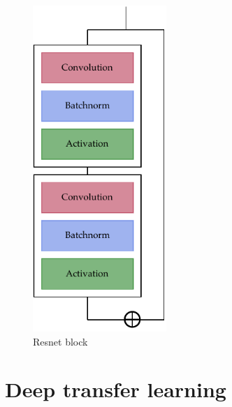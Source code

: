 \begin{figure}[tb]
	\centering
	\includegraphics[width=0.45\textwidth]{machine_learning/figures/resnet}
	\caption{Resnet block}\label{fig:resnet}
\end{figure}


\section{Deep transfer learning}
